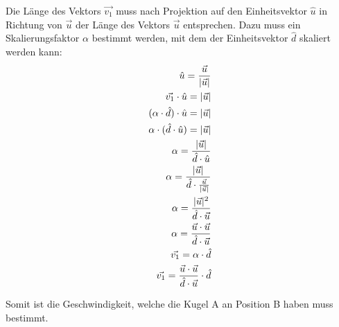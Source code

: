 Die Länge des Vektors $\vec{v_1}$ muss nach Projektion auf den Einheitsvektor $\hat{u}$ in Richtung
von $\vec{u}$ der Länge des Vektors $\vec{u}$ entsprechen. Dazu muss ein Skalierungsfaktor $\alpha$ bestimmt werden,
mit dem der Einheitsvektor $\hat{d}$ skaliert werden kann:
\begin{align}
    \hat{u} = \frac{\vec{u}}{\lvert \vec{u} \rvert}\\
    \vec{v_1} \cdot \hat{u} = \lvert \vec{u} \rvert\\
    (\alpha \cdot \hat{d}) \cdot \hat{u} = \lvert \vec{u} \rvert\\
    \alpha \cdot (\hat{d} \cdot \hat{u}) = \lvert \vec{u} \rvert\\
    \alpha = \frac{\lvert \vec{u} \rvert}{\hat{d} \cdot \hat{u}}\\
    \alpha = \frac{\lvert \vec{u} \rvert}{\hat{d} \cdot \frac{\vec{u}}{\lvert \vec{u} \rvert}}\\
    \alpha = \frac{\lvert \vec{u} \rvert^2}{\hat{d} \cdot \vec{u}}\\
    \alpha = \frac{\vec{u} \cdot \vec{u}}{\hat{d} \cdot \vec{u}}\\
    \vec{v_1} = \alpha \cdot \hat{d}\\
    \vec{v_1} = \frac{\vec{u} \cdot \vec{u}}{\hat{d} \cdot \vec{u}} \cdot \hat{d}\\
\end{align}

Somit ist die Geschwindigkeit, welche die Kugel A an Position B haben muss bestimmt.
